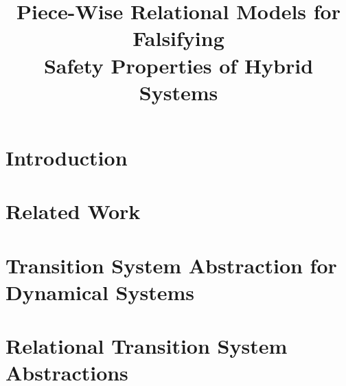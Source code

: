 \documentclass[9pt,sigconf]{acmart}
\begin{document}



\title{Piece-Wise Relational Models for Falsifying \\ Safety Properties of Hybrid Systems}






\begin{abstract}

\end{abstract}

\maketitle

\section{Introduction}
\label{sec:intro}



\section{Related Work}
\label{sec:rel}


\section{Transition System Abstraction for Dynamical Systems}
\label{sec:graph-abs}


\section{Relational Transition System Abstractions}
\label{sec:prelims}

\end{document}
